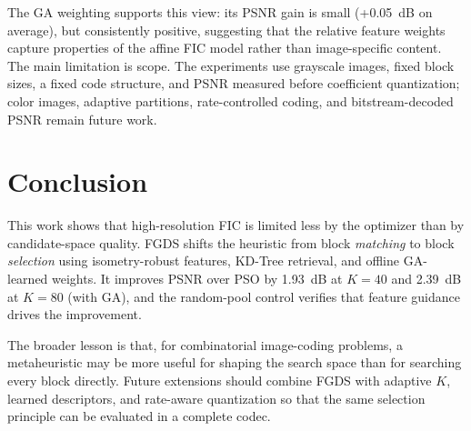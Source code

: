 \documentclass[conference, a4paper]{IEEEtran}
\begin{document}
The GA weighting supports this view: its PSNR gain is small (+0.05~dB on average), but consistently positive, suggesting that the relative feature weights capture properties of the affine FIC model rather than image-specific content. The main limitation is scope. The experiments use grayscale images, fixed block sizes, a fixed code structure, and PSNR measured before coefficient quantization; color images, adaptive partitions, rate-controlled coding, and bitstream-decoded PSNR remain future work.


\section{Conclusion}

This work shows that high-resolution FIC is limited less by the optimizer than by candidate-space quality. FGDS shifts the heuristic from block \emph{matching} to block \emph{selection} using isometry-robust features, KD-Tree retrieval, and offline GA-learned weights. It improves PSNR over PSO by 1.93~dB at \mbox{$K\!=\!40$} and 2.39~dB at \mbox{$K\!=\!80$} (with GA), and the random-pool control verifies that feature guidance drives the improvement.

The broader lesson is that, for combinatorial image-coding problems, a metaheuristic may be more useful for shaping the search space than for searching every block directly. Future extensions should combine FGDS with adaptive \mbox{$K$}, learned descriptors, and rate-aware quantization so that the same selection principle can be evaluated in a complete codec.




\vspace{12pt}
\end{document}
